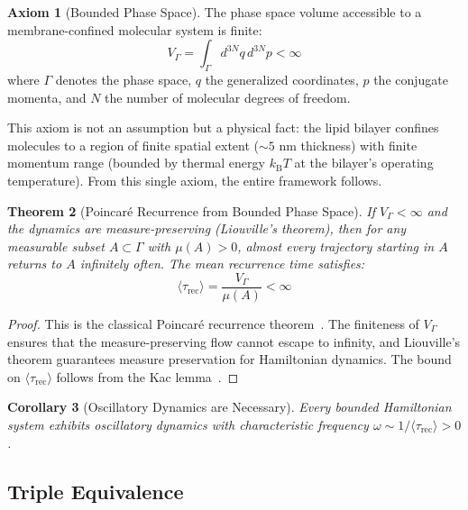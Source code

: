 \documentclass[twocolumn,10pt,a4paper]{article}
\newtheorem{theorem}{Theorem}[section]
\newtheorem{corollary}[theorem]{Corollary}
\theoremstyle{definition}
\newtheorem{axiom}[theorem]{Axiom}
\theoremstyle{remark}
\newcommand{\kB}{k_{\mathrm{B}}}
\newcommand{\Vgamma}{V_\Gamma}
\begin{document}
\begin{axiom}[Bounded Phase Space]
\label{ax:bounded}
The phase space volume accessible to a membrane-confined molecular system is finite:
\begin{equation}
\label{eq:bounded_phase}
\Vgamma = \int_\Gamma d^{3N}q \, d^{3N}p < \infty
\end{equation}
where $\Gamma$ denotes the phase space, $q$ the generalized coordinates, $p$ the conjugate momenta, and $N$ the number of molecular degrees of freedom.
\end{axiom}

This axiom is not an assumption but a physical fact: the lipid bilayer confines molecules to a region of finite spatial extent ($\sim 5$ nm thickness) with finite momentum range (bounded by thermal energy $\kB T$ at the bilayer's operating temperature). From this single axiom, the entire framework follows.

\begin{theorem}[Poincar\'{e} Recurrence from Bounded Phase Space]
\label{thm:poincare}
If $\Vgamma < \infty$ and the dynamics are measure-preserving (Liouville's theorem), then for any measurable subset $A \subset \Gamma$ with $\mu(A) > 0$, almost every trajectory starting in $A$ returns to $A$ infinitely often. The mean recurrence time satisfies:
\begin{equation}
\label{eq:recurrence}
\langle \tau_{\mathrm{rec}} \rangle = \frac{\Vgamma}{\mu(A)} < \infty
\end{equation}
\end{theorem}

\begin{proof}
This is the classical Poincar\'{e} recurrence theorem~\citep{poincare1890probleme}. The finiteness of $\Vgamma$ ensures that the measure-preserving flow cannot escape to infinity, and Liouville's theorem guarantees measure preservation for Hamiltonian dynamics. The bound on $\langle \tau_{\mathrm{rec}} \rangle$ follows from the Kac lemma~\citep{kac1947notion}.
\end{proof}

\begin{corollary}[Oscillatory Dynamics are Necessary]
\label{cor:oscillatory}
Every bounded Hamiltonian system exhibits oscillatory dynamics with characteristic frequency $\omega \sim 1/\langle \tau_{\mathrm{rec}} \rangle > 0$.
\end{corollary}

\subsection{Triple Equivalence}
\end{document}
